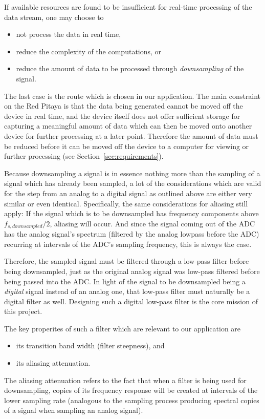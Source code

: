 If available resources are found to be insufficient for real-time processing of
the data stream, one may choose to
\begin{itemize}\tightlist
    \item
        not process the data in real time,
    \item
        reduce the complexity of the computations, or
    \item
        reduce the amount of data to be processed through \emph{downsampling}
        of the signal.
\end{itemize}
The  last case  is the  route  which is  chosen in  our application. The  main
constraint on the Red Pitaya is that  the data being generated cannot be moved
off the device in  real time, and the device itself  does not offer sufficient
storage for capturing a meaningful amount of data which can then be moved onto
another device for  further processing at a later  point. Therefore the amount
of data must  be reduced before it can  be moved off the device  to a computer
for viewing or further processing (see Section~\ref{sec:requirements}).

Because downsampling a signal is in  essence nothing more than the sampling of
a signal which has already been sampled, a lot of the considerations which are
valid for the  step from an analog  to a digital signal as  outlined above are
either very  similar or even identical. Specifically,  the same considerations
for  aliasing still  apply: If  the  signal which  is  to  be downsampled  has
frequency components  above $f_{s,  downsampled}/2$, aliasing  will occur. And
since  the signal  coming out  of  the ADC  has the  analog signal's  spectrum
(filtered by the analog lowpass before  the ADC) recurring at intervals of the
ADC's sampling frequency, this is always the case.

Therefore,  the sampled  signal must  be  filtered through  a low-pass  filter
before  being downsampled,  just as  the original  analog signal  was low-pass
filtered  before being  passed into  the  ADC. In light  of the  signal to  be
downsampled  being a  \emph{digital} signal  instead  of an  analog one,  that
low-pass filter must  naturally be a digital filter as  well. Designing such a
digital low-pass filter is the core mission of this project.

The key properites of such a filter which are relevant to our application are
\begin{itemize}\tightlist
    \item
        its transition band width (filter steepness), and
    \item
        its aliasing attenuation.
\end{itemize}
The aliasing attenuation refers  to the fact that when a  filter is being used
for  downsampling,  copies  of  its  frequency response  will  be  created  at
intervals  of the  lower  sampling  rate (analogous  to  the sampling  process
producing spectral copies of a signal when sampling an analog signal).

